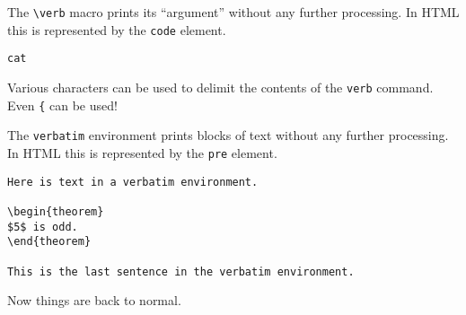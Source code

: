 \documentclass{article}
\begin{document}
The \verb|\verb| macro prints its ``argument'' without any further processing. In HTML this is represented by the \verb|code| element.

\verb|cat|

Various characters can be used to delimit the contents of the \verb{verb{ command. Even \verb}{} can be used! 

The \verb|verbatim| environment prints blocks of text without any further processing. In HTML this is represented by the \verb|pre| element.

\begin{verbatim}
Here is text in a verbatim environment.

\begin{theorem}
$5$ is odd.
\end{theorem}

This is the last sentence in the verbatim environment.
\end{verbatim}

Now things are back to normal.
\end{document}
